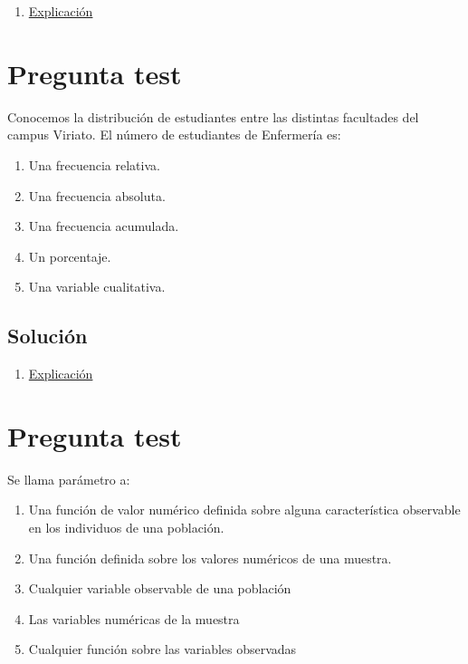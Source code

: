 \documentclass[
]{book}
\providecommand{\tightlist}{%
  \setlength{\itemsep}{0pt}\setlength{\parskip}{0pt}}
\begin{document}
\begin{enumerate}
\def\labelenumi{\alph{enumi})}
\setcounter{enumi}{2}
\tightlist
\item
  \href{https://1fjmanzano.github.io/bioestadistica/tablas-de-frecuencias.html}{Explicación}
\end{enumerate}

\hypertarget{pregunta-test-10}{%
\section{Pregunta test}\label{pregunta-test-10}}

Conocemos la distribución de estudiantes entre las distintas facultades del campus Viriato. El número de estudiantes de Enfermería es:

\begin{enumerate}
\def\labelenumi{\alph{enumi})}
\tightlist
\item
  Una frecuencia relativa.
\item
  Una frecuencia absoluta.
\item
  Una frecuencia acumulada.
\item
  Un porcentaje.
\item
  Una variable cualitativa.
\end{enumerate}

\hypertarget{soluciuxf3n-10}{%
\subsection{Solución}\label{soluciuxf3n-10}}

\begin{enumerate}
\def\labelenumi{\alph{enumi})}
\setcounter{enumi}{1}
\tightlist
\item
  \href{https://1fjmanzano.github.io/bioestadistica/tablas-de-frecuencias.html}{Explicación}
\end{enumerate}

\hypertarget{pregunta-test-11}{%
\section{Pregunta test}\label{pregunta-test-11}}

Se llama parámetro a:

\begin{enumerate}
\def\labelenumi{\alph{enumi})}
\tightlist
\item
  Una función de valor numérico definida sobre alguna característica observable en los individuos de una población.
\item
  Una función definida sobre los valores numéricos de una muestra.
\item
  Cualquier variable observable de una población
\item
  Las variables numéricas de la muestra
\item
  Cualquier función sobre las variables observadas
\end{enumerate}
\end{document}
